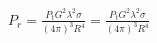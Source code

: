 \documentclass[preview]{standalone}
\begin{document}
\begin{align*}
P_r = \frac{P_t G^2 \lambda^2 \sigma}{(4 \pi)^3 R^4} = \frac{P_t G^2 \lambda^2 \sigma}{(4 \pi)^3 R^4}
\end{align*}
\end{document}
